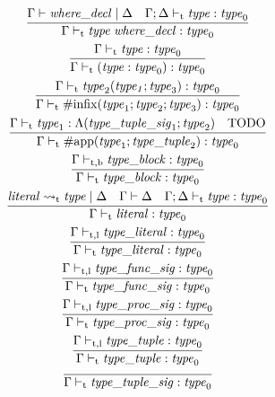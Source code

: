 \begin{gather*}
    \infer{\Gamma \vdash_\mathrm{t} \mathit{type}\; \mathit{where\_decl}: \mathit{type}_0}{
        \Gamma \vdash \mathit{where\_decl} \mid \Delta
        &
        \Gamma; \Delta \vdash_\mathrm{t} \mathit{type}: \mathit{type}_0
    }
    \\
    \infer{\Gamma \vdash_\mathrm{t} (\mathit{type}: \mathit{type}_0): \mathit{type}_0}{
        \Gamma \vdash_\mathrm{t} \mathit{type}: \mathit{type}_0
    }
    \\
    \infer{\Gamma \vdash_\mathrm{t} \mathrm{\#infix}(\mathit{type}_1; \mathit{type}_2; \mathit{type}_3): \mathit{type}_0}{
        \Gamma \vdash_\mathrm{t} \mathit{type}_2(\mathit{type_1}; \mathit{type}_3): \mathit{type}_0
    }
    \\
    \infer{\Gamma \vdash_\mathrm{t} \mathrm{\#app}(\mathit{type}_1; \mathit{type\_tuple}_2): \mathit{type}_0}{
        \Gamma \vdash_\mathrm{t} \mathit{type}_1: \Lambda(\mathit{type\_tuple\_sig}_1; \mathit{type}_2)
        &
        \text{TODO}
    }
    \\
    \infer{\Gamma \vdash_\mathrm{t} \mathit{type\_block}: \mathit{type}_0}{
        \Gamma \vdash_{\mathrm{t}, \mathrm{b}} \mathit{type\_block}: \mathit{type}_0
    }
    \\
    \infer{\Gamma \vdash_\mathrm{t} \mathit{literal}: \mathit{type}_0}{
        \mathit{literal} \rightsquigarrow_\mathrm{t} \mathit{type} \mid \Delta
        &
        \Gamma \vdash \Delta
        &
        \Gamma; \Delta \vdash_\mathrm{t} \mathit{type}: \mathit{type}_0
    }
    \\
    \infer{\Gamma \vdash_\mathrm{t} \mathit{type\_literal}: \mathit{type}_0}{
        \Gamma \vdash_{\mathrm{t}, \mathrm{l}} \mathit{type\_literal}: \mathit{type}_0
    }
    \\
    \infer{\Gamma \vdash_\mathrm{t} \mathit{type\_func\_sig}: \mathit{type}_0}{
        \Gamma \vdash_{\mathrm{t}, \mathrm{l}} \mathit{type\_func\_sig}: \mathit{type}_0
    }
    \\
    \infer{\Gamma \vdash_\mathrm{t} \mathit{type\_proc\_sig}: \mathit{type}_0}{
        \Gamma \vdash_{\mathrm{t}, \mathrm{l}} \mathit{type\_proc\_sig}: \mathit{type}_0
    }
    \\
    \infer{\Gamma \vdash_\mathrm{t} \mathit{type\_tuple}: \mathit{type}_0}{
        \Gamma \vdash_{\mathrm{t}, \mathrm{l}} \mathit{type\_tuple}: \mathit{type}_0
    }
    \\
    \infer{\Gamma \vdash_\mathrm{t} \mathit{type\_tuple\_sig}: \mathit{type}_0}{
}
\end{gather*}
